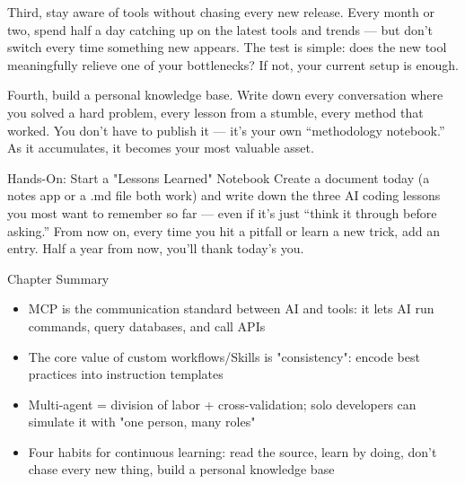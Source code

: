Third, stay aware of tools without chasing every new release. Every month or two, spend half a day catching up on the latest tools and trends — but don't switch every time something new appears. The test is simple: does the new tool meaningfully relieve one of your bottlenecks? If not, your current setup is enough.

Fourth, build a personal knowledge base. Write down every conversation where you solved a hard problem, every lesson from a stumble, every method that worked. You don't have to publish it — it's your own “methodology notebook.” As it accumulates, it becomes your most valuable asset.

\begin{tcbpractice}{Hands-On: Start a "Lessons Learned" Notebook}
Create a document today (a notes app or a .md file both work) and write down the three AI coding lessons you most want to remember so far — even if it's just “think it through before asking.” From now on, every time you hit a pitfall or learn a new trick, add an entry. Half a year from now, you'll thank today's you.

\end{tcbpractice}

\begin{tcbsummary}{Chapter Summary}
\begin{itemize}
  \item MCP is the communication standard between AI and tools: it lets AI run commands, query databases, and call APIs
  \item The core value of custom workflows/Skills is "consistency": encode best practices into instruction templates
  \item Multi-agent = division of labor + cross-validation; solo developers can simulate it with "one person, many roles"
  \item Four habits for continuous learning: read the source, learn by doing, don't chase every new thing, build a personal knowledge base
\end{itemize}

\end{tcbsummary}
